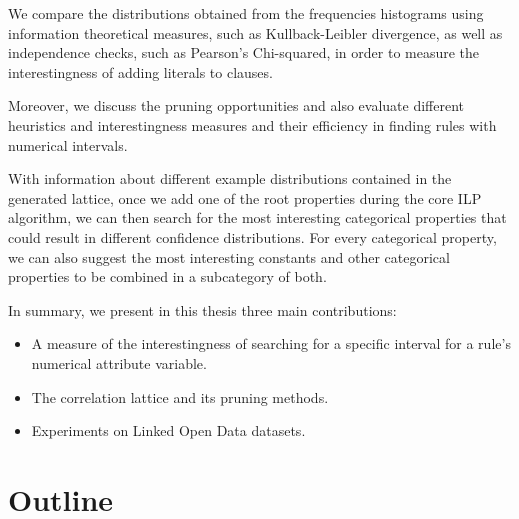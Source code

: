 We compare the distributions obtained from the frequencies histograms using information theoretical measures,
such as Kullback-Leibler divergence, as well as independence checks, such as Pearson's Chi-squared, in order to
measure the interestingness of adding literals to clauses.

Moreover, we discuss the pruning opportunities and also evaluate different heuristics and interestingness measures and
their efficiency in finding rules with numerical intervals. 

\begin{comment}
In a clause containing a numerical attribute in the body, we can obtain a support and confidence as well as support
value for each of the buckets. Therewith, we can search the most interesting intervals that satisfies the support and
confidence thresholds
\end{comment}

With information about different example distributions contained in the generated lattice, once we add one of the root
properties during the core ILP algorithm, we can then search for the most interesting categorical properties that could
result in different confidence distributions. For every categorical property, we can also suggest the most interesting
constants and other categorical properties to be combined in a subcategory of both.

In summary, we present in this thesis three main contributions:

\begin{itemize}
 \item A measure of the interestingness of searching for a specific interval for a rule's numerical attribute
variable.
 \item The correlation lattice and its pruning methods.
 \item Experiments on Linked Open Data datasets.
\end{itemize}


\section{Outline}

\begin{comment}
 The remainder of this thesis is structured as follows. In
Chapter~\ref{ch:technical_background}, we provide technical background on
MapReduce and BigTable. In Chapter~\ref{ch:related_work}, we present a
summary of previous work in the areas of duplicate and near-duplicate detection,
information retrieval on web archives, and MapReduce applications in graph
processing. Following that, we state our problem and describe solutions in
Chapter~\ref{ch:redundancy_control}. In Chapter~\ref{ch:mapreduce_impl}, we
describe an implementation of our solution using the MapReduce framework. In
Chapter~\ref{ch:experiments}, we present our experimental results. We conclude
this thesis and outline directions of future research in Chapter~\ref{ch:future_work}.
\end{comment}
